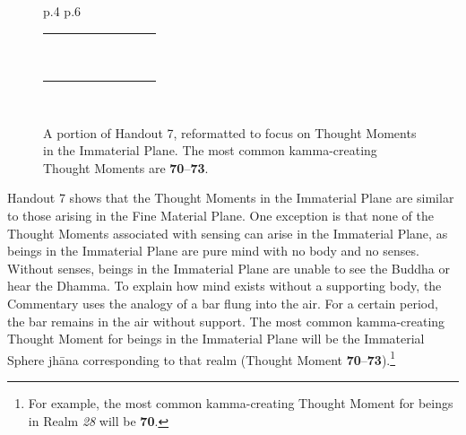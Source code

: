 \begin{figure}[H]
\begin{tabular}{L{\dimexpr.4\tabcolsep} R{\dimexpr.6\tabcolsep}}
\begin{tabular}{p{} p{}
p{}
R{.077\textwidth} |
p{.039\textwidth}
p{.039\textwidth}
p{.039\textwidth}
p{.039\textwidth}
p{.039\textwidth}}
\\
& &  &  & \tm & \tm & \tm & \tm & \tm
\\
& &  &  & & & & & \tm
\\\midrule
{} &  &  &  & \tm & & & &
\\
& &  &  & & \tm & & &
\\
& &  &  & & & \tm & &
\\
& &  &  & & & & \tm &
\\
&  &  &  & & \tm & & &
\\
& &  &  & & & \tm & &
\\
& &  &  & & & & \tm &
\\
& &  &  & & & & & \tm
\\
\bottomrule
\end{tabular}
\\
\end{tabular}

\caption{A portion of Handout 7, reformatted to focus on Thought Moments in the Immaterial Plane. The most common kamma-creating Thought Moments are \textbf{70}--\textbf{73}.}
\label{fig:Immaterial}
\end{figure}

Handout 7 shows that the Thought Moments in the Immaterial Plane are similar to those arising in the Fine Material Plane. One exception is that none of the Thought Moments associated with sensing can arise in the Immaterial Plane, as beings in the Immaterial Plane are pure mind with no body and no senses. Without senses, beings in the Immaterial Plane are unable to see the Buddha or hear the Dhamma. To explain how mind exists without a supporting body, the Commentary uses the analogy of a bar flung into the air. For a certain period, the bar remains in the air without support. The most common kamma-creating Thought Moment for beings in the Immaterial Plane will be the Immaterial Sphere jhāna corresponding to that realm (Thought Moment \textbf{70}--\textbf{73}).\footnote{For example, the most common kamma-creating Thought Moment for beings in Realm \textit{28} will be \textbf{70}.}


